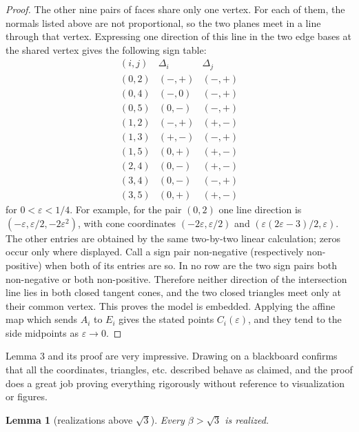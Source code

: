 \documentclass[12pt]{article}
\newtheorem{lemma}{Lemma}
\newcommand{\review}[1]{\begin{reviewbox}#1\end{reviewbox}}
\begin{document}
\begin{proof}
The other nine pairs of faces share only one vertex.  For each of them,
the normals listed above are not proportional, so the two planes meet in a
line through that vertex.  Expressing one direction of this line in the two edge bases
at the shared vertex gives the following sign table:
\[
\begin{array}{c|c|c}
(i,j)&\Delta_i&\Delta_j\\ \hline
(0,2)&(-,+)&(-,+)\\
(0,4)&(-,0)&(-,+)\\
(0,5)&(0,-)&(-,+)\\
(1,2)&(-,+)&(+,-)\\
(1,3)&(+,-)&(-,+)\\
(1,5)&(0,+)&(+,-)\\
(2,4)&(0,-)&(+,-)\\
(3,4)&(0,-)&(-,+)\\
(3,5)&(0,+)&(+,-)
\end{array}
\]
for \(0<\varepsilon<1/4\).  For example, for the pair \((0,2)\)
one line direction is \((-\varepsilon,\varepsilon/2,-2\varepsilon^2)\),
with cone coordinates
\((-2\varepsilon,\varepsilon/2)\) and
\((\varepsilon(2\varepsilon-3)/2,\varepsilon)\).  The other entries are
obtained by the same two-by-two linear calculation; zeros occur only
where displayed.  Call a sign pair non-negative (respectively
non-positive) when both of its entries are so.  In no row are the two
sign pairs both non-negative or both non-positive.  Therefore neither direction of the intersection line
lies in both closed tangent cones, and the two closed triangles meet only
at their common vertex.  This proves the model is embedded.  Applying the affine map which sends \(A_i\) to \(E_i\) gives
the stated points \(C_i(\varepsilon)\), and they tend to the side
midpoints as \(\varepsilon\to0\).
\end{proof}

\review{Lemma 3 and its proof are very impressive. Drawing on a blackboard confirms that all the coordinates, triangles, etc. described behave as claimed, and the proof does a great job proving everything rigorously without reference to visualization or figures.}

\begin{lemma}[realizations above \(\sqrt3\)]\label{lem:upper}
Every \(\beta>\sqrt3\) is realized.
\end{lemma}
\end{document}
